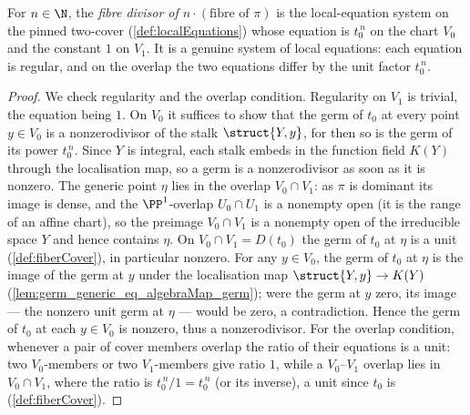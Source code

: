 \begin{definition}
  \label{def:fiberDivisor}
  \leanok
  For \(n \in \N\), the \emph{fibre divisor of \(n\cdot(\text{fibre of }\pi)\)} is the
  local-equation system on the pinned two-cover (\ref{def:localEquations}) whose equation is
  \(t_0^{\,n}\) on the chart \(V_0\) and the constant \(1\) on \(V_1\). It is a genuine system of
  local equations: each equation is regular, and on the overlap the two equations differ by the unit
  factor \(t_0^{\,n}\).
\end{definition}
\begin{proof}
  \leanok
  We check regularity and the overlap condition. Regularity on \(V_1\) is trivial, the equation
  being \(1\). On \(V_0\) it suffices to show that the germ of \(t_0\) at every point \(y \in V_0\)
  is a nonzerodivisor of the stalk \(\struct{Y,y}\), for then so is the germ of its power
  \(t_0^{\,n}\). Since \(Y\) is integral, each stalk embeds in the function field \(K(Y)\) through
  the localisation map, so a germ is a nonzerodivisor as soon as it is nonzero. The generic point
  \(\eta\) lies in the overlap \(V_0 \cap V_1\): as \(\pi\) is dominant its image is dense, and the
  \(\PP^1\)-overlap \(U_0 \cap U_1\) is a nonempty open (it is the range of an affine chart), so the
  preimage \(V_0 \cap V_1\) is a nonempty open of the irreducible space \(Y\) and hence contains
  \(\eta\). On \(V_0 \cap V_1 = D(t_0)\) the germ of \(t_0\) at \(\eta\) is a unit
  (\ref{def:fiberCover}), in particular nonzero. For any \(y \in V_0\), the germ of \(t_0\) at
  \(\eta\) is the image of the germ at \(y\) under the localisation map \(\struct{Y,y} \to K(Y)\)
  (\ref{lem:germ_generic_eq_algebraMap_germ}); were the germ at \(y\) zero, its image --- the
  nonzero unit germ at \(\eta\) --- would be zero, a contradiction. Hence the germ of \(t_0\) at each
  \(y \in V_0\) is nonzero, thus a nonzerodivisor. For the overlap condition, whenever a pair of
  cover members overlap the ratio of their equations is a unit: two \(V_0\)-members or two
  \(V_1\)-members give ratio \(1\), while a \(V_0\)--\(V_1\) overlap lies in \(V_0 \cap V_1\), where
  the ratio is \(t_0^{\,n}/1 = t_0^{\,n}\) (or its inverse), a unit since \(t_0\) is
  (\ref{def:fiberCover}).
\end{proof}

